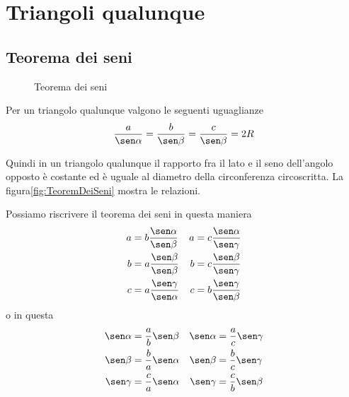 \section{Triangoli qualunque}
\subsection{Teorema dei seni}
\begin{figure}
	\centering
	
	\caption{Teorema dei seni}
	\label{fig:TeoremDeiSeni}
\end{figure}
Per un triangolo qualunque valgono le seguenti uguaglianze\[\dfrac{a}{\sen\alpha}=\dfrac{b}{\sen\beta}=\dfrac{c}{\sen\beta}=2R \]

Quindi in un triangolo qualunque il rapporto fra il lato e il seno dell'angolo opposto è costante ed è uguale al diametro della circonferenza circoscritta. La figura\nobs\vref{fig:TeoremDeiSeni} mostra le relazioni.

Possiamo riscrivere il teorema dei seni in questa maniera 
\begin{align*}
a&=b\dfrac{\sen\alpha}{\sen\beta}& a&=c\dfrac{\sen\alpha}{\sen\gamma}\\
b&=a\dfrac{\sen\beta}{\sen\beta}& b&=c\dfrac{\sen\beta}{\sen\gamma}\\
c&=a\dfrac{\sen\gamma}{\sen\alpha}& c&=b\dfrac{\sen\gamma}{\sen\beta}
\end{align*}
o in questa
\begin{align*}
\sen\alpha&=\dfrac{a}{b}\sen\beta&\sen\alpha&=\dfrac{a}{c}\sen\gamma\\
\sen\beta&=\dfrac{b}{a}\sen\alpha&\sen\beta&=\dfrac{b}{c}\sen\gamma\\
\sen\gamma&=\dfrac{c}{a}\sen\alpha&\sen\gamma&=\dfrac{c}{b}\sen\beta\\
\end{align*}
